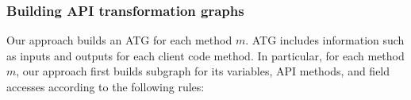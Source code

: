 %
%
%

\subsubsection{Building API transformation graphs }

Our approach builds an ATG for each method $m$. ATG includes information such as
inputs and outputs for each client code method. In particular, for
each method $m$, our approach first builds subgraph for its variables,
API methods, and field accesses according to the following rules:




